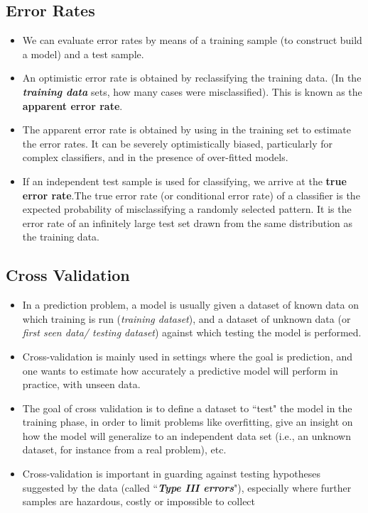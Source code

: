 \documentclass[a4paper,12pt]{article}
\begin{document}
\subsection{Error Rates}

\begin{itemize}
	\item We can evaluate error rates by means of a training sample (to construct build a model) and a test sample.
	
	
	\item 	An optimistic error rate is obtained by reclassifying the training data. (In the \textbf{\textit{training data}} sets, how many cases were misclassified). This is known as the \textbf{apparent error rate}.
	
	
	\item 	The apparent error rate is obtained by using in the training set to estimate
	the error rates. It can be severely optimistically biased, particularly for complex classifiers, and in the presence of over-fitted models.
	
	
	\item	If an independent test sample is used for classifying, we arrive at the  \textbf{true error rate}.The true error rate (or conditional error rate) of a classifier is the expected
	probability of misclassifying a randomly selected pattern.
	It is the error rate of an infinitely large test set drawn from the same distribution as the training data.
\end{itemize}








\subsection{Cross Validation}
\begin{itemize}
\item In a prediction problem, a model is usually given a dataset of known data 
on which training is run (\textit{training dataset}), and a dataset of unknown data (or \textit{first seen data/ testing dataset}) against which testing the model is performed.
\item Cross-validation is mainly used in settings where the goal is prediction, and one wants to estimate how accurately a predictive model will perform in practice, with unseen data.
\item The goal of cross validation is to define a dataset to ``test" the model in the training phase, in order to limit problems like overfitting, give an insight on how the model will generalize to an independent data set (i.e., an unknown dataset, for instance from a real problem), etc.
\item Cross-validation is important in guarding against testing hypotheses suggested by the data (called ``\textbf{\textit{Type III errors}}"), especially where further samples 
are hazardous, costly or impossible to collect 
\end{itemize}
\end{document}
